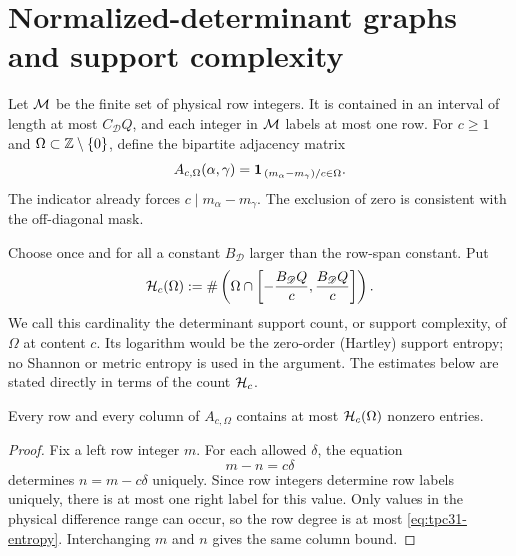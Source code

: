 \section{Normalized-determinant graphs and support complexity}
\label{sec:tpc31-row-entropy}

Let $\mathcal M$ be the finite set of physical row integers.  It is contained
in an interval of length at most $C_{\mathscr D}Q$, and each integer in
$\mathcal M$ labels at most one row.  For $c\ge1$ and
$\Omega\subset\mathbb Z\setminus\{0\}$, define the bipartite adjacency matrix
\begin{equation}
 A_{c,\Omega}(\alpha,\gamma)
 =\mathbf 1_{\,(m_\alpha-m_\gamma)/c\in\Omega}.
 \label{eq:tpc31-adjacency}
\end{equation}
The indicator already forces $c\mid m_\alpha-m_\gamma$.  The exclusion
of zero is consistent with the off-diagonal mask.

\begin{definition}
\label{def:tpc31-entropy}
Choose once and for all a constant $B_{\mathscr D}$ larger than the
row-span constant.  Put
\begin{equation}
 \mathcal H_c(\Omega)
 :=\#\left(
 \Omega\cap
 \left[-\frac{B_{\mathscr D}Q}{c},
        \frac{B_{\mathscr D}Q}{c}\right]
 \right).
 \label{eq:tpc31-entropy}
\end{equation}
We call this cardinality the determinant support count, or support
complexity, of $\Omega$ at content $c$.  Its logarithm would be the
zero-order (Hartley) support entropy; no Shannon or metric entropy is
used in the argument.  The estimates below are stated directly in
terms of the count $\mathcal H_c$.
\end{definition}

\begin{lemma}
\label{lem:tpc31-degree}
Every row and every column of $A_{c,\Omega}$ contains at most
$\mathcal H_c(\Omega)$ nonzero entries.
\end{lemma}

\begin{proof}
Fix a left row integer $m$.  For each allowed $\delta$, the equation
\[
 m-n=c\delta
\]
determines $n=m-c\delta$ uniquely.  Since row integers determine row
labels uniquely, there is at most one right label for this value.
Only values in the physical difference range can occur, so the row
degree is at most \eqref{eq:tpc31-entropy}.  Interchanging $m$ and $n$
gives the same column bound.
\end{proof}

